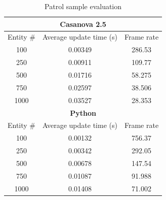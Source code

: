 \begin{table}
	\centering
	\begin{tabular}{|c|c|c|}
		\hline
		\multicolumn{3}{|c|}{\textbf{Casanova 2.5}} \\
		\hline
		Entity \# & Average update time (s) & Frame rate \\
		\hline
		100 & 0.00349 & 286.53 \\
		\hline
		250 & 0.00911 & 109.77 \\
		\hline
		500 & 0.01716 & 58.275 \\
		\hline
		750 & 0.02597 & 38.506 \\
		\hline
		1000 & 0.03527 & 28.353 \\
		\hline
		\multicolumn{3}{|c|}{\textbf{Python}} \\
		\hline
		Entity \# & Average update time (s) & Frame rate \\
		\hline
		100 & 0.00132 & 756.37 \\
		\hline
		250 & 0.00342 & 292.05 \\
		\hline
		500 & 0.00678 & 147.54 \\
		\hline
		750 & 0.01087 & 91.988 \\
		\hline
		1000 & 0.01408 & 71.002 \\
		\hline
	\end{tabular}
	\caption{Patrol sample evaluation}
	\label{tab:ch_mcnv_casanova_evaluation}
\end{table}

